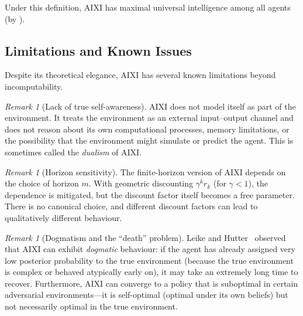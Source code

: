 \documentclass[11pt,a4paper]{article}
\theoremstyle{definition}
\theoremstyle{remark}
\newtheorem{remark}[theorem]{Remark}
\begin{document}
Under this definition, AIXI has maximal universal intelligence among all
agents (by ).

\subsection{Limitations and Known Issues}

Despite its theoretical elegance, AIXI has several known limitations beyond
incomputability.

\begin{remark}[Lack of true self-awareness]
AIXI does not model itself as part of the environment.  It treats the
environment as an external input--output channel and does not reason about
its own computational processes, memory limitations, or the possibility
that the environment might simulate or predict the agent.  This is
sometimes called the \emph{dualism} of AIXI.
\end{remark}

\begin{remark}[Horizon sensitivity]
The finite-horizon version of AIXI depends on the choice of horizon $m$.
With geometric discounting $\gamma^k r_k$ (for $\gamma<1$), the dependence
is mitigated, but the discount factor itself becomes a free parameter.
There is no canonical choice, and different discount factors can lead to
qualitatively different behaviour.
\end{remark}

\begin{remark}[Dogmatism and the ``death'' problem]
Leike and Hutter~\cite{Leike2016} observed that AIXI can exhibit
\emph{dogmatic} behaviour: if the agent has already assigned very low
posterior probability to the true environment (because the true environment
is complex or behaved atypically early on), it may take an extremely
long time to recover.  Furthermore, AIXI can converge to a policy that
is suboptimal in certain adversarial environments---it is self-optimal
(optimal under its own beliefs) but not necessarily optimal in the
true environment.
\end{remark}
\end{document}
